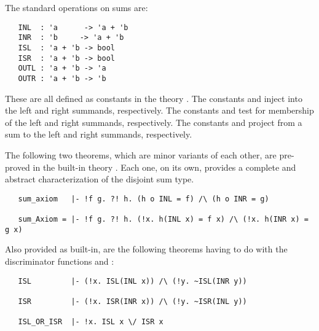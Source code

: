The standard operations on sums are:


\begin{hol}
\begin{verbatim}
   INL  : 'a      -> 'a + 'b
   INR  : 'b     -> 'a + 'b
   ISL  : 'a + 'b -> bool
   ISR  : 'a + 'b -> bool
   OUTL : 'a + 'b -> 'a
   OUTR : 'a + 'b -> 'b
\end{verbatim}\end{hol}

\noindent These are all defined as constants in the theory .  The
constants  and  inject into the left and right summands,
respectively. The constants  and  test for membership of the
left and right summands, respectively. The constants  and 
project from a sum to the left and right summands, respectively.

The following two theorems, which are minor variants of each other, are
pre-proved in the built-in theory . Each one, on its own, provides a
complete and abstract characterization of the disjoint sum type.

\begin{hol}
\begin{verbatim}
   sum_axiom   |- !f g. ?! h. (h o INL = f) /\ (h o INR = g)

   sum_Axiom = |- !f g. ?! h. (!x. h(INL x) = f x) /\ (!x. h(INR x) = g x)
\end{verbatim}\end{hol}

\noindent Also provided as built-in, are the following theorems having to
do with the discriminator functions  and :

\begin{hol}
\begin{verbatim}
   ISL         |- (!x. ISL(INL x)) /\ (!y. ~ISL(INR y))

   ISR         |- (!x. ISR(INR x)) /\ (!y. ~ISR(INL y))

   ISL_OR_ISR  |- !x. ISL x \/ ISR x
\end{verbatim}\end{hol}

